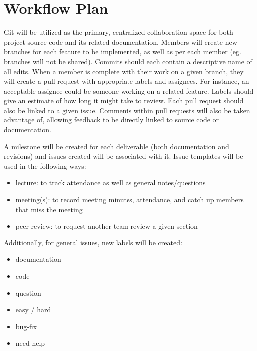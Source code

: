 \documentclass{article}
\begin{document}
\section{Workflow Plan}

\iffalse
\begin{itemize}
	\item How will you be using git, including branches, pull request, etc.?
	\item How will you be managing issues, including template issues, issue
	classification, etc.?
  \item Use of CI/CD
\end{itemize}
\fi

Git will be utilized as the primary, centralized collaboration space for both project
source code and its related documentation. Members will create new branches for each
feature to be implemented, as well as per each member (eg. branches will not be shared). 
Commits should each contain a descriptive name of all edits. When a member is complete with 
their work on a given branch, they will create a pull request
with appropriate labels and assignees. For instance, an acceptable assignee could be someone
working on a related feature. Labels should give an estimate of how long it might take to
review. Each pull request should also be linked to a given issue. Comments within pull 
requests will also be taken advantage of, allowing feedback to be directly linked to source
code or documentation.

A milestone will be created for each deliverable (both documentation and revisions) and issues
created will be associated with it. Issue templates will be used in the following ways:

\begin{itemize}
  \item lecture: to track attendance as well as general notes/questions
  \item meeting(s): to record meeting minutes, attendance, and catch up members that miss the meeting
  \item peer review: to request another team review a given section
\end{itemize}

Additionally, for general issues, new labels will be created:

\begin{itemize}
  \item documentation
  \item code
  \item question
  \item easy / hard
  \item bug-fix
  \item need help
\end{itemize}
\end{document}
